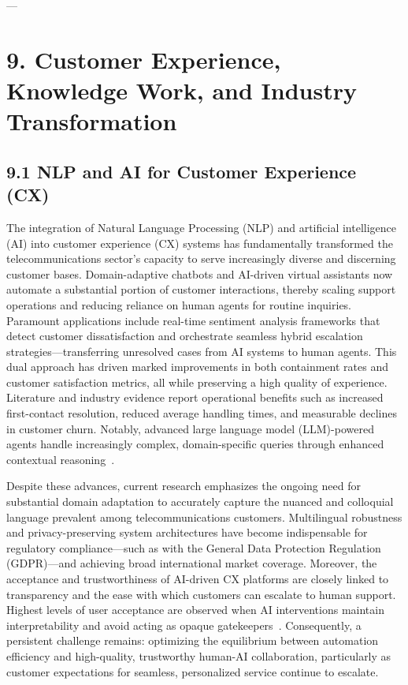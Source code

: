 \documentclass[11pt]{article}
\begin{document}
---

\section{9. Customer Experience, Knowledge Work, and Industry Transformation}

\subsection{9.1 NLP and AI for Customer Experience (CX)}

The integration of Natural Language Processing (NLP) and artificial intelligence (AI) into customer experience (CX) systems has fundamentally transformed the telecommunications sector’s capacity to serve increasingly diverse and discerning customer bases. Domain-adaptive chatbots and AI-driven virtual assistants now automate a substantial portion of customer interactions, thereby scaling support operations and reducing reliance on human agents for routine inquiries. Paramount applications include real-time sentiment analysis frameworks that detect customer dissatisfaction and orchestrate seamless hybrid escalation strategies—transferring unresolved cases from AI systems to human agents. This dual approach has driven marked improvements in both containment rates and customer satisfaction metrics, all while preserving a high quality of experience. Literature and industry evidence report operational benefits such as increased first-contact resolution, reduced average handling times, and measurable declines in customer churn. Notably, advanced large language model (LLM)-powered agents handle increasingly complex, domain-specific queries through enhanced contextual reasoning~\cite{ref18}.

Despite these advances, current research emphasizes the ongoing need for substantial domain adaptation to accurately capture the nuanced and colloquial language prevalent among telecommunications customers. Multilingual robustness and privacy-preserving system architectures have become indispensable for regulatory compliance—such as with the General Data Protection Regulation (GDPR)—and achieving broad international market coverage. Moreover, the acceptance and trustworthiness of AI-driven CX platforms are closely linked to transparency and the ease with which customers can escalate to human support. Highest levels of user acceptance are observed when AI interventions maintain interpretability and avoid acting as opaque gatekeepers~\cite{ref18}. Consequently, a persistent challenge remains: optimizing the equilibrium between automation efficiency and high-quality, trustworthy human-AI collaboration, particularly as customer expectations for seamless, personalized service continue to escalate.
\end{document}
